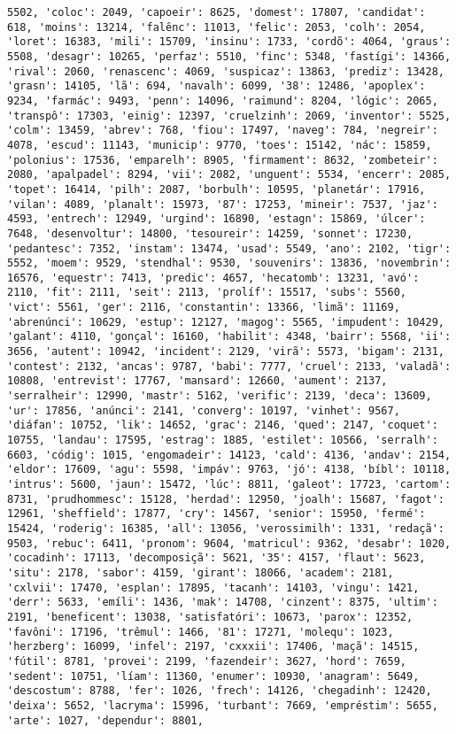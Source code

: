 \documentclass[11pt]{article}
\begin{document}
\begin{Verbatim}[commandchars=\\\{\}]
5502, 'coloc': 2049, 'capoeir': 8625, 'domest': 17807, 'candidat': 618, 'moins': 13214, 'falênc': 11013, 'felic': 2053, 'colh': 2054, 'loret': 16383, 'mili': 15709, 'insinu': 1733, 'cordõ': 4064, 'graus': 5508, 'desagr': 10265, 'perfaz': 5510, 'finc': 5348, 'fastígi': 14366, 'rival': 2060, 'renascenc': 4069, 'suspicaz': 13863, 'prediz': 13428, 'grasn': 14105, 'lã': 694, 'navalh': 6099, '38': 12486, 'apoplex': 9234, 'farmác': 9493, 'penn': 14096, 'raimund': 8204, 'lógic': 2065, 'transpô': 17303, 'einig': 12397, 'cruelzinh': 2069, 'inventor': 5525, 'colm': 13459, 'abrev': 768, 'fiou': 17497, 'naveg': 784, 'negreir': 4078, 'escud': 11143, 'municip': 9770, 'toes': 15142, 'nác': 15859, 'polonius': 17536, 'emparelh': 8905, 'firmament': 8632, 'zombeteir': 2080, 'apalpadel': 8294, 'vii': 2082, 'unguent': 5534, 'encerr': 2085, 'topet': 16414, 'pilh': 2087, 'borbulh': 10595, 'planetár': 17916, 'vilan': 4089, 'planalt': 15973, '87': 17253, 'mineir': 7537, 'jaz': 4593, 'entrech': 12949, 'urgind': 16890, 'estagn': 15869, 'úlcer': 7648, 'desenvoltur': 14800, 'tesoureir': 14259, 'sonnet': 17230, 'pedantesc': 7352, 'instam': 13474, 'usad': 5549, 'ano': 2102, 'tigr': 5552, 'moem': 9529, 'stendhal': 9530, 'souvenirs': 13836, 'novembrin': 16576, 'equestr': 7413, 'predic': 4657, 'hecatomb': 13231, 'avó': 2110, 'fit': 2111, 'seit': 2113, 'prolíf': 15517, 'subs': 5560, 'vict': 5561, 'ger': 2116, 'constantin': 13366, 'limã': 11169, 'abrenúnci': 10629, 'estup': 12127, 'magog': 5565, 'impudent': 10429, 'galant': 4110, 'gonçal': 16160, 'habilit': 4348, 'bairr': 5568, 'ii': 3656, 'autent': 10942, 'incident': 2129, 'virã': 5573, 'bigam': 2131, 'contest': 2132, 'ancas': 9787, 'babi': 7777, 'cruel': 2133, 'valadã': 10808, 'entrevist': 17767, 'mansard': 12660, 'aument': 2137, 'serralheir': 12990, 'mastr': 5162, 'verific': 2139, 'deca': 13609, 'ur': 17856, 'anúnci': 2141, 'converg': 10197, 'vinhet': 9567, 'diáfan': 10752, 'lik': 14652, 'grac': 2146, 'qued': 2147, 'coquet': 10755, 'landau': 17595, 'estrag': 1885, 'estilet': 10566, 'serralh': 6603, 'códig': 1015, 'engomadeir': 14123, 'cald': 4136, 'andav': 2154, 'eldor': 17609, 'agu': 5598, 'impáv': 9763, 'jó': 4138, 'bíbl': 10118, 'intrus': 5600, 'jaun': 15472, 'lúc': 8811, 'galeot': 17723, 'cartom': 8731, 'prudhommesc': 15128, 'herdad': 12950, 'joalh': 15687, 'fagot': 12961, 'sheffield': 17877, 'cry': 14567, 'senior': 15950, 'fermé': 15424, 'roderig': 16385, 'all': 13056, 'verossimilh': 1331, 'redaçã': 9503, 'rebuc': 6411, 'pronom': 9604, 'matricul': 9362, 'desabr': 1020, 'cocadinh': 17113, 'decomposiçã': 5621, '35': 4157, 'flaut': 5623, 'situ': 2178, 'sabor': 4159, 'girant': 18066, 'academ': 2181, 'cxlvii': 17470, 'esplan': 17895, 'tacanh': 14103, 'vingu': 1421, 'derr': 5633, 'emíli': 1436, 'mak': 14708, 'cinzent': 8375, 'ultim': 2191, 'beneficent': 13038, 'satisfatóri': 10673, 'parox': 12352, 'favôni': 17196, 'trêmul': 1466, '81': 17271, 'molequ': 1023, 'herzberg': 16099, 'infel': 2197, 'cxxxii': 17406, 'maçã': 14515, 'fútil': 8781, 'provei': 2199, 'fazendeir': 3627, 'hord': 7659, 'sedent': 10751, 'líam': 11360, 'enumer': 10930, 'anagram': 5649, 'descostum': 8788, 'fer': 1026, 'frech': 14126, 'chegadinh': 12420, 'deixa': 5652, 'lacryma': 15996, 'turbant': 7669, 'empréstim': 5655, 'arte': 1027, 'dependur': 8801, 
\end{Verbatim}
\end{document}
